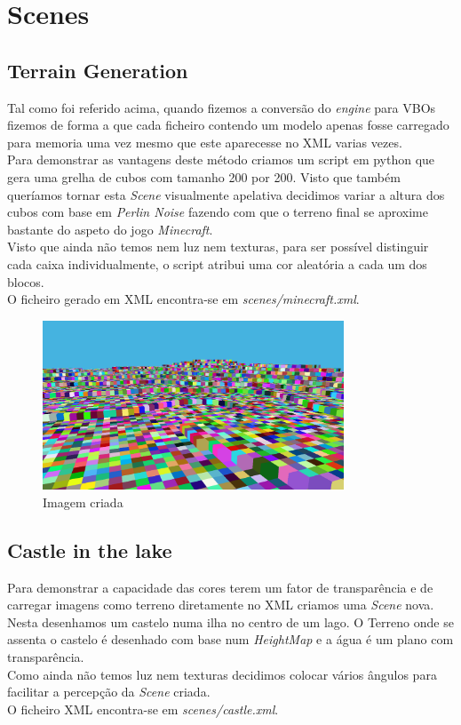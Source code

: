 \documentclass[a4paper]{report}
\begin{document}


\chapter{Scenes}
\section{Terrain Generation}
Tal como foi referido acima, quando fizemos a conversão do \textit{engine} para
VBOs fizemos de forma a que cada ficheiro contendo um modelo apenas fosse
carregado para memoria uma vez mesmo que este aparecesse no XML varias vezes.\\
Para demonstrar as vantagens deste método criamos um script em python que gera
uma grelha de cubos com tamanho 200 por 200. Visto que também queríamos tornar
esta \textit{Scene} visualmente apelativa decidimos variar a altura dos cubos com
base em \textit{Perlin Noise} fazendo com que o terreno final se aproxime
bastante do aspeto do jogo \textit{Minecraft}.\\
Visto que ainda não temos nem luz nem texturas, para ser possível distinguir
cada caixa individualmente, o script atribui uma cor aleatória a cada um dos
blocos.\\
O ficheiro gerado em XML encontra-se em \textit{scenes/minecraft.xml}.

\begin{figure}[H]
    \centering 
    \includegraphics[width=0.8\textwidth]{images/minecraft.png}  
    \caption{Imagem criada}
\end{figure}

\section{Castle in the lake}
Para demonstrar a capacidade das cores terem um fator de transparência e de
carregar imagens como terreno diretamente no XML criamos uma \textit{Scene}
nova. Nesta desenhamos um castelo numa ilha no centro de um lago. O Terreno onde
se assenta o castelo é desenhado com base num \textit{HeightMap} e a água é um
plano com transparência.\\
Como ainda não temos luz nem texturas decidimos colocar vários ângulos para
facilitar a percepção da \textit{Scene} criada.\\
O ficheiro XML encontra-se em \textit{scenes/castle.xml}.
\end{document}
